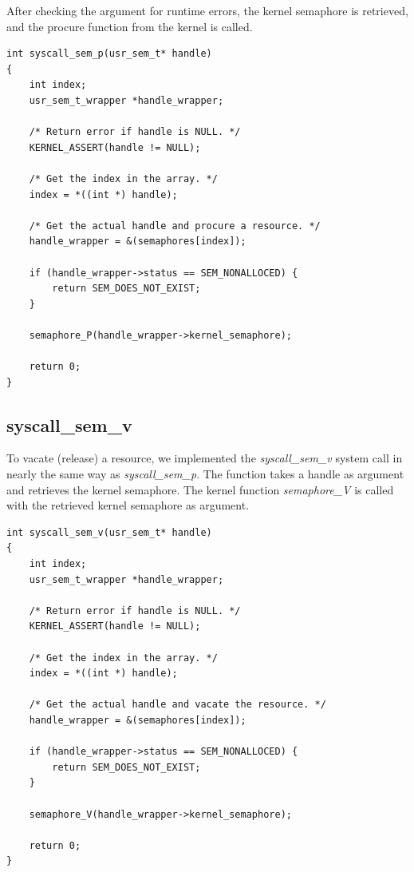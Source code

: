 \documentclass[11pt]{article}
\begin{document}
After checking the argument for runtime errors, the kernel semaphore is retrieved, and the procure function from the kernel is called.

\begin{lstlisting}[style=customc]
int syscall_sem_p(usr_sem_t* handle)
{
    int index;
    usr_sem_t_wrapper *handle_wrapper;

    /* Return error if handle is NULL. */
    KERNEL_ASSERT(handle != NULL);

    /* Get the index in the array. */
    index = *((int *) handle);

    /* Get the actual handle and procure a resource. */
    handle_wrapper = &(semaphores[index]);

    if (handle_wrapper->status == SEM_NONALLOCED) {
        return SEM_DOES_NOT_EXIST;
    }

    semaphore_P(handle_wrapper->kernel_semaphore);

    return 0;
}
\end{lstlisting}

\subsection{syscall\_sem\_v}
To vacate (release) a resource, we implemented the \emph{syscall\_sem\_v} system call in nearly the same way as \emph{syscall\_sem\_p}. The function takes a handle as argument and retrieves the kernel semaphore. The kernel function \emph{semaphore\_V} is called with the retrieved kernel semaphore as argument.
\begin{lstlisting}[style=customc]
int syscall_sem_v(usr_sem_t* handle)
{
    int index;
    usr_sem_t_wrapper *handle_wrapper;

    /* Return error if handle is NULL. */
    KERNEL_ASSERT(handle != NULL);

    /* Get the index in the array. */
    index = *((int *) handle);

    /* Get the actual handle and vacate the resource. */
    handle_wrapper = &(semaphores[index]);

    if (handle_wrapper->status == SEM_NONALLOCED) {
        return SEM_DOES_NOT_EXIST;
    }

    semaphore_V(handle_wrapper->kernel_semaphore);

    return 0;
}
\end{lstlisting}
\end{document}
